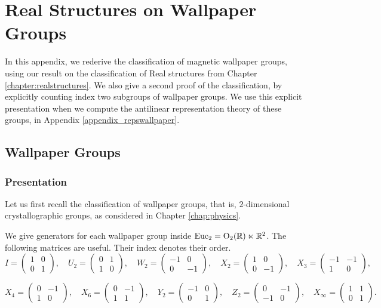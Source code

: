 \chapter{Real Structures on Wallpaper Groups} \label{appendix_wallpaper}

In this appendix, we rederive the classification of magnetic wallpaper groups, using our result on the classification of Real structures from Chapter \ref{chapter:realstructures}. We also give a second proof of the classification, by explicitly counting index two subgroups of wallpaper groups. We use this explicit presentation when we compute the antilinear representation theory of these groups, in Appendix \ref{appendix_repswallpaper}.

\section{Wallpaper Groups}

\subsection{Presentation} Let us first recall the classification of wallpaper groups, that is, $2$-dimensional crystallographic groups, as considered in Chapter \ref{chap:physics}.

We give generators for each wallpaper group inside $\operatorname{Euc}_2 = \mathrm{O}_2 ({\mathbb R})\ltimes {\mathbb R}^2$. The following matrices are useful. Their index denotes their order.
\[
I =\begin{pmatrix}1&0\\0&1\end{pmatrix},\quad
U_2=\begin{pmatrix}0&1\\1&0\end{pmatrix},\quad
W_2=\begin{pmatrix}-1&0\\0&-1\end{pmatrix},\quad
X_2=\begin{pmatrix}1&0\\0&-1\end{pmatrix},\quad
X_3=\begin{pmatrix}-1&-1\\1&0\end{pmatrix},
\]

\[
X_4=\begin{pmatrix}0&-1\\1&0\end{pmatrix}, \quad
X_6=\begin{pmatrix}0&-1\\1&1\end{pmatrix},\quad
Y_2=\begin{pmatrix}-1&0\\0&1\end{pmatrix}, \quad
Z_2=\begin{pmatrix}0&-1\\-1&0\end{pmatrix}, \quad
X_{\infty}=\begin{pmatrix}1&1\\0&1\end{pmatrix}.
\]

